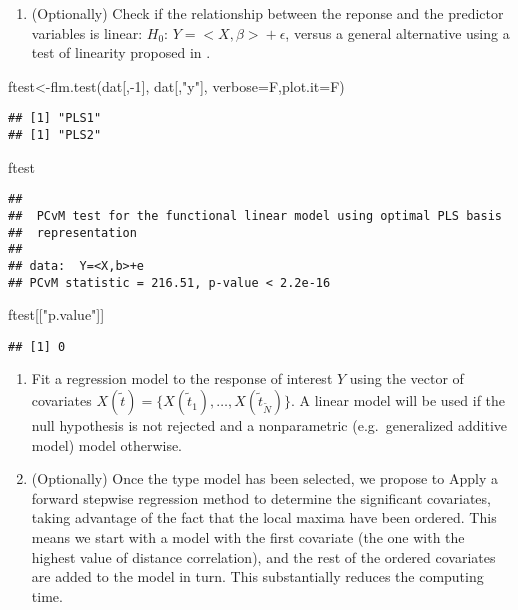 \documentclass[
]{book}
\newenvironment{Shaded}{\begin{snugshade}}{\end{snugshade}}
\newcommand{\AttributeTok}[1]{\textcolor[rgb]{0.77,0.63,0.00}{#1}}
\newcommand{\DecValTok}[1]{\textcolor[rgb]{0.00,0.00,0.81}{#1}}
\newcommand{\FunctionTok}[1]{\textcolor[rgb]{0.00,0.00,0.00}{#1}}
\newcommand{\NormalTok}[1]{#1}
\newcommand{\OtherTok}[1]{\textcolor[rgb]{0.56,0.35,0.01}{#1}}
\newcommand{\SpecialCharTok}[1]{\textcolor[rgb]{0.00,0.00,0.00}{#1}}
\newcommand{\StringTok}[1]{\textcolor[rgb]{0.31,0.60,0.02}{#1}}
\providecommand{\tightlist}{%
  \setlength{\itemsep}{0pt}\setlength{\parskip}{0pt}}
\begin{document}
\begin{enumerate}
\def\labelenumi{\arabic{enumi}.}
\setcounter{enumi}{2}
\tightlist
\item
  (Optionally) Check if the relationship between the reponse and the predictor variables is linear: \(H_0:\,Y=\big<X,\beta\big>+\epsilon\), versus a general alternative using a test of linearity proposed in \citet{garcia2014goodness}.
\end{enumerate}

\begin{Shaded}
\begin{Highlighting}[]
\NormalTok{ftest}\OtherTok{\textless{}{-}}\FunctionTok{flm.test}\NormalTok{(dat[,}\SpecialCharTok{{-}}\DecValTok{1}\NormalTok{], dat[,}\StringTok{"y"}\NormalTok{],}
\AttributeTok{verbose=}\NormalTok{F,}\AttributeTok{plot.it=}\NormalTok{F)}
\end{Highlighting}
\end{Shaded}

\begin{verbatim}
## [1] "PLS1"
## [1] "PLS2"
\end{verbatim}

\begin{Shaded}
\begin{Highlighting}[]
\NormalTok{ftest}
\end{Highlighting}
\end{Shaded}

\begin{verbatim}
## 
##  PCvM test for the functional linear model using optimal PLS basis
##  representation
## 
## data:  Y=<X,b>+e
## PCvM statistic = 216.51, p-value < 2.2e-16
\end{verbatim}

\begin{Shaded}
\begin{Highlighting}[]
\NormalTok{ftest[[}\StringTok{"p.value"}\NormalTok{]]}
\end{Highlighting}
\end{Shaded}

\begin{verbatim}
## [1] 0
\end{verbatim}

\begin{enumerate}
\def\labelenumi{\arabic{enumi}.}
\setcounter{enumi}{3}
\item
  Fit a regression model to the response of interest \(Y\) using the vector of covariates \(X(\tilde{t})=\{X(\tilde t_1), \ldots, X(\tilde{t}_{\tilde{N}})\}\). A linear model will be used if the null hypothesis is not rejected and a nonparametric (e.g.~generalized additive model) model otherwise.
\item
  (Optionally) Once the type model has been selected, we propose to
  Apply a forward stepwise regression method to determine the significant covariates, taking advantage of the fact that the local maxima have been ordered. This means we start with a model with the first covariate (the one with the highest value of distance correlation), and the rest of the ordered covariates are added to the model in turn. This substantially reduces the computing time.
\end{enumerate}
\end{document}
